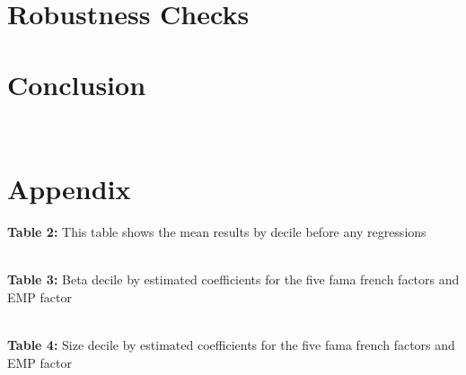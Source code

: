 \documentclass[12pt,oneside,reqno]{amsart}
\begin{document}
\section{Robustness Checks}
\label{Robustness}

\section{Conclusion}
\label{Conclusion}

{}


\\

\section{Appendix}
\vspace{1cm}
\textbf{Table 2:} This table shows the mean results by decile before any regressions\\
\vspace{1cm}

\\
\textbf{Table 3:} Beta decile by estimated coefficients for the  five fama french factors and EMP factor\\
\vspace{1cm}

\\
\textbf{Table 4:} Size decile by estimated coefficients for the  five fama french factors and EMP factor\\



\clearpage
\restoregeometry


%
\end{document}
